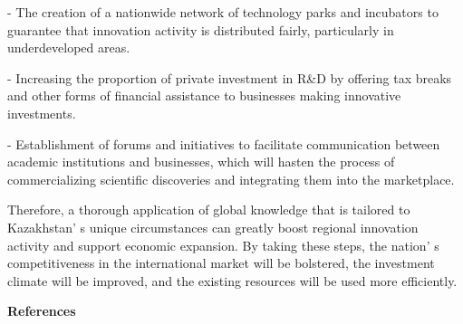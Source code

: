 \begin{multicols}{2}
- The creation of a nationwide network of technology parks and
incubators to guarantee that innovation activity is distributed
fairly, particularly in underdeveloped areas.

- Increasing the proportion of private investment in R\&D by offering
tax breaks and other forms of financial assistance to businesses
making innovative investments.

- Establishment of forums and initiatives to facilitate communication
between academic institutions and businesses, which will hasten the
process of commercializing scientific discoveries and integrating them
into the marketplace.

Therefore, a thorough application of global knowledge that is tailored
to Kazakhstan' s unique circumstances can greatly boost
regional innovation activity and support economic expansion. By taking
these steps, the nation' s competitiveness in the
international market will be bolstered, the investment climate will be
improved, and the existing resources will be used more efficiently.
\end{multicols}

\begin{center}
{\bfseries References}
\end{center}

